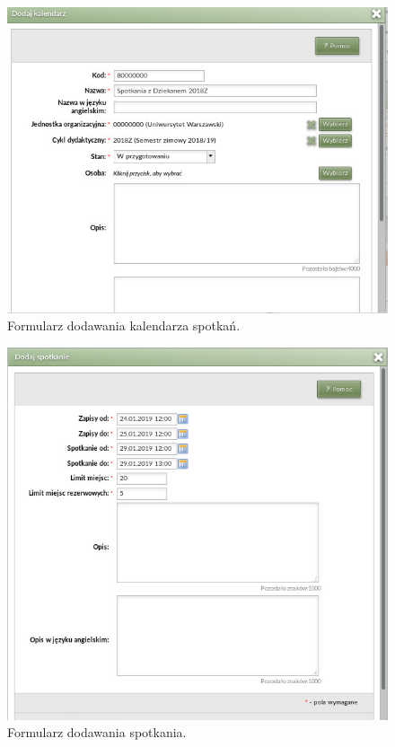 \documentclass[licencjacka]{pracamgr}
\begin{document}
\begin{figure}[!]
  \includegraphics[width=\linewidth]{formularz_kalendarzy.jpg}
  \caption{Formularz dodawania kalendarza spotkań.}
  \label{fig:kalenformkalenadm}
\end{figure}

\begin{figure}[!]
  \includegraphics[width=\linewidth]{formularz_spotkan.jpg}
  \caption{Formularz dodawania spotkania.}
  \label{fig:kalenformspotkadm}
\end{figure}
\end{document}
